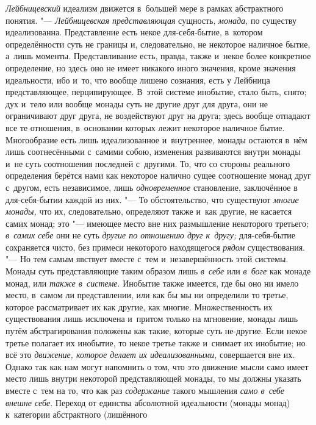 {\em Лейбницевский} идеализм движется в~большей мере в
рамках абстрактного понятия. "--- {\em Лейбницевская
представляющая} сущность, {\em монада,} по существу
идеализованна. Представление есть некое для-себя-бытие, в~котором
определённости суть не границы и, следовательно, не некоторое наличное
бытие, а~лишь моменты. Представливание есть, правда, также и~некое более
конкретное определение, но здесь оно не имеет никакого иного значения,
кроме значения идеальности, ибо и~то, что вообще лишено сознания, есть у
Лейбница представляющее, перципирующее. В~этой системе инобытие, стало
быть, снято; дух и~тело или вообще монады суть не другие друг для друга,
они не ограничивают друг друга, не воздействуют друг на друга; здесь вообще
отпадают все те отношения, в~основании которых лежит некоторое наличное
бытие. Многообразие есть лишь идеализованное и~внутреннее, монады остаются
в~нём лишь соотнесёнными с~самими собою, изменения развиваются внутри
монады и~не суть соотношения последней с~другими. То, что со стороны
реального определения берётся нами как некоторое налично сущее соотношение
монад друг с~другом, есть независимое, лишь
{\em одновременное} становление, заключённое в
для-себя-бытии каждой из них. "--- То обстоятельство, что существуют
{\em многие монады,} что их, следовательно, определяют
также и~как другие, не касается самих монад; это "--- имеющее место вне них
размышление некоторого третьего; {\em в~самих себе} они
не суть {\em другие по отношению друг к~другу;}
для-себя-бытие сохраняется чисто, без примеси некоторого находящегося
{\em рядом} существования. "--- Но тем самым явствует
вместе с~тем и~незавершённость этой системы. Монады суть представляющие
таким образом лишь {\em в~себе} или {\em в~боге} как монаде монад, или
{\em также в~системе}. Инобытие также имеется, где бы
оно ни имело место, в~самом ли представлении, или как бы мы ни определили
то третье, которое рассматривает их как другие, как многие. Множественность
их существования лишь исключена и~притом только на мгновение, монады лишь
путём абстрагирования положены как такие, которые суть не-другие. Если
некое третье полагает их инобытие, то некое третье также и~снимает их
инобытие; но всё это {\em движение, которое делает их
идеализованными,} совершается вне их. Однако так как нам могут напомнить о
том, что это движение мысли само имеет место лишь внутри некоторой
представляющей монады, то мы должны указать вместе с~тем на то, что как раз
{\em содержание} такого мышления
{\em само в~себе внешне себе}. Переход от единства
абсолютной идеальности (монады монад) к~категории абстрактного (лишённого
